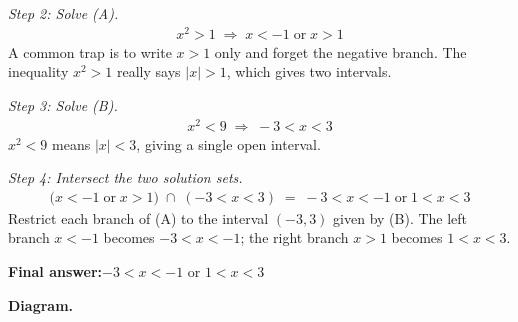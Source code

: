 \documentclass[11pt]{article}
\begin{document}
\textit{Step 2: Solve (A).}
\[\begin{gathered}
x^2 > 1 \;\Longrightarrow\; x < -1 \;\text{or}\; x > 1
\end{gathered}\]
A common trap is to write \( x > 1 \) only and forget the negative branch. The inequality \( x^2 > 1 \) really says \( |x| > 1 \), which gives two intervals.

\textit{Step 3: Solve (B).}
\[\begin{gathered}
x^2 < 9 \;\Longrightarrow\; -3 < x < 3
\end{gathered}\]
\( x^2 < 9 \) means \( |x| < 3 \), giving a single open interval.

\textit{Step 4: Intersect the two solution sets.}
\[\begin{gathered}
\bigl(x < -1 \;\text{or}\; x > 1\bigr) \;\cap\; (-3 < x < 3) \;=\; -3 < x < -1 \;\text{or}\; 1 < x < 3
\end{gathered}\]
Restrict each branch of (A) to the interval \( (-3, 3) \) given by (B). The left branch \( x < -1 \) becomes \( -3 < x < -1 \); the right branch \( x > 1 \) becomes \( 1 < x < 3 \).

\begin{answerbox}
\textbf{Final answer:}\quad \(\displaystyle -3 < x < -1\) or \(\displaystyle 1 < x < 3\)
\end{answerbox}
\textbf{Diagram.}
\end{document}
